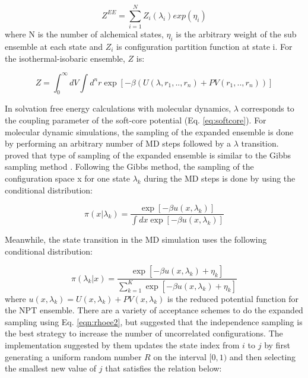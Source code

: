 \begin{equation}
Z^{EE} = \sum_{i=1}^{N} Z_{i}(\lambda_{i}) exp(\eta_{i})
\label{eqn:ee}
\end{equation}   
where N is the number of alchemical states, $\eta_{i}$ is the arbitrary weight of the sub ensemble at each state and $Z_{i}$ is configuration partition function at state i. For the isothermal-isobaric ensemble, $Z$ is:

\begin{equation}
Z = {\int_{0}^{\infty} dV \int d^{n}r \exp \left[ -\beta \left(U(\lambda, r_{1},..,r_{n}) + PV(r_{1},..,r_{n}) \right) \right]}
\end{equation} 

In solvation free energy calculations with molecular dynamics, $\lambda$ corresponds to the coupling parameter of the soft-core potential (Eq. \ref{eq:softcore}). For molecular dynamic simulations, the sampling of the expanded ensemble is done by performing an arbitrary number of MD  steps followed by a $\lambda$ transition.  proved that type of sampling of the expanded ensemble is similar to the Gibbs sampling method \cite{geman1984,liu2002}. Following the Gibbs method, the sampling of the configuration space x for one state $\lambda_{k}$ during the MD steps is done by using the conditional distribution:

\begin{equation}
\pi(x|\lambda_{k}) = \dfrac{\exp[-\beta u(x,\lambda_{k})]}{\int dx \exp [- \beta u(x,\lambda_{k})]}
\label{eqn:rhoee1}
\end{equation} 

Meanwhile, the state transition in the MD simulation uses the following conditional distribution:

\begin{equation}
\pi(\lambda_{k}|x) = \dfrac{\exp[-\beta u(x,\lambda_{k}) + \eta_{k}]}{ \sum_{k=1}^{K} \exp [- \beta u(x,\lambda_{k})+ \eta_{k}]}
\label{eqn:rhoee2}
\end{equation} 
where $u(x,\lambda_{k}) = U(x,\lambda_{k}) + PV(x,\lambda_{k})$ is the reduced potential function for the NPT ensemble. There are a variety of acceptance schemes to do the expanded sampling using Eq. \eqref{eqn:rhoee2}, but  suggested that the independence sampling \cite{liu2002} is the best strategy to increase the number of uncorrelated configurations. The implementation suggested by them updates the state index from $i$ to $j$ by first generating a uniform random number $R$ on the interval $[0,1)$ and then selecting the smallest new value of $j$ that satisfies  the relation below:


